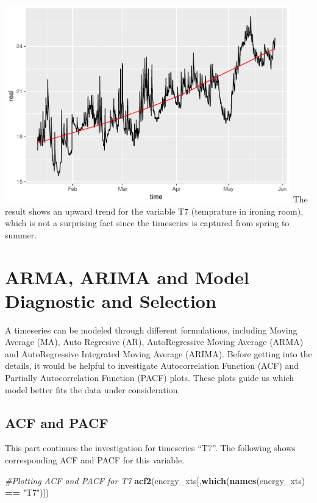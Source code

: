 \documentclass[]{article}
\newenvironment{Shaded}{\begin{snugshade}}{\end{snugshade}}
\newcommand{\KeywordTok}[1]{\textcolor[rgb]{0.13,0.29,0.53}{\textbf{#1}}}
\newcommand{\StringTok}[1]{\textcolor[rgb]{0.31,0.60,0.02}{#1}}
\newcommand{\CommentTok}[1]{\textcolor[rgb]{0.56,0.35,0.01}{\textit{#1}}}
\newcommand{\OperatorTok}[1]{\textcolor[rgb]{0.81,0.36,0.00}{\textbf{#1}}}
\newcommand{\NormalTok}[1]{#1}
\begin{document}
\includegraphics[width=468]{README_figs/README-unnamed-chunk-14-1} The
result shows an upward trend for the variable T7 (temprature in ironing
room), which is not a surprising fact since the timeseries is captured
from spring to summer.

\section{ARMA, ARIMA and Model Diagnostic and
Selection}\label{arma-arima-and-model-diagnostic-and-selection}

A timeseries can be modeled through different formulations, including
Moving Average (MA), Auto Regresive (AR), AutoRegressive Moving Average
(ARMA) and AutoRegressive Integrated Moving Average (ARIMA). Before
getting into the details, it would be helpful to investigate
Autocorrelation Function (ACF) and Partially Autocorrelation Function
(PACF) plots. These plots guide us which model better fits the data
under consideration.

\subsection{ACF and PACF}\label{acf-and-pacf}

This part continues the investigation for timeseries ``T7''. The
following shows corresponding ACF and PACF for this variable.

\begin{Shaded}
\begin{Highlighting}[]
\CommentTok{#Plotting ACF and PACF for T7}
\KeywordTok{acf2}\NormalTok{(energy_xts[,}\KeywordTok{which}\NormalTok{(}\KeywordTok{names}\NormalTok{(energy_xts) }\OperatorTok{==}\StringTok{ "T7"}\NormalTok{)])}
\end{Highlighting}
\end{Shaded}
\end{document}
